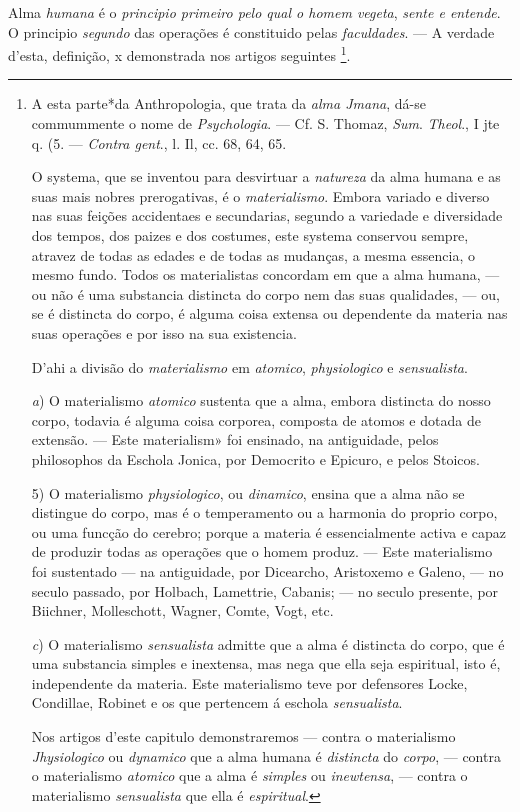 Alma \emph{humana} é o \emph{principio primeiro pelo qual o homem vegeta}, \emph{sente e entende}. O principio \emph{segundo} das operações é constituido pelas \emph{faculdades}. --- A verdade d'esta, definição, x demonstrada nos artigos seguintes \footnote{A esta parte*da Anthropologia, que trata da \emph{alma Jmana}, dá-se commummente o nome de \emph{Psychologia}. --- Cf. S. Thomaz, \emph{Sum}. \emph{Theol}., I jte q. (5. --- \emph{Contra gent}., l. Il, cc. 68, 64, 65.\par O systema, que se inventou para desvirtuar a \emph{natureza} da alma humana e as suas mais nobres prerogativas, é o \emph{materialismo}. Embora variado e diverso nas suas feições accidentaes e secundarias, segundo a variedade e diversidade dos tempos, dos paizes e dos costumes, este systema conservou sempre, atravez de todas as edades e de todas as mudanças, a mesma essencia, o mesmo fundo. Todos os materialistas concordam em que a alma humana, --- ou não é uma substancia distincta do corpo nem das suas qualidades, --- ou, se é distincta do corpo, é alguma coisa extensa ou dependente da materia nas suas operações e por isso na sua existencia.\par D'ahi a divisão do \emph{materialismo} em \emph{atomico}, \emph{physiologico} e \emph{sensualista}.\par \emph{a}) O materialismo \emph{atomico} sustenta que a alma, embora distincta do nosso corpo, todavia é alguma coisa corporea, composta de atomos e dotada de extensão. --- Este materialism» foi ensinado, na antiguidade, pelos philosophos da Eschola Jonica, por Democrito e Epicuro, e pelos Stoicos.\par 5) O materialismo \emph{physiologico}, ou \emph{dinamico}, ensina que a alma não se distingue do corpo, mas é o temperamento ou a harmonia do proprio corpo, ou uma funcção do cerebro; porque a materia é essencialmente activa e capaz de produzir todas as operações que o homem produz. --- Este materialismo foi sustentado --- na antiguidade, por Dicearcho, Aristoxemo e Galeno, --- no seculo passado, por Holbach, Lamettrie, Cabanis; --- no seculo presente, por Biichner, Molleschott, Wagner, Comte, Vogt, etc.\par \emph{c}) O materialismo \emph{sensualista} admitte que a alma é distincta do corpo, que é uma substancia simples e inextensa, mas nega que ella seja espiritual, isto é, independente da materia. Este materialismo teve por defensores Locke, Condillae, Robinet e os que pertencem á eschola \emph{sensualista}.\par Nos artigos d'este capitulo demonstraremos --- contra o materialismo \emph{Jhysiologico} ou \emph{dynamico} que a alma humana é \emph{distincta} do \emph{corpo}, --- contra o materialismo \emph{atomico} que a alma é \emph{simples} ou \emph{inewtensa}, --- contra o materialismo \emph{sensualista} que ella é \emph{espiritual}.}.

